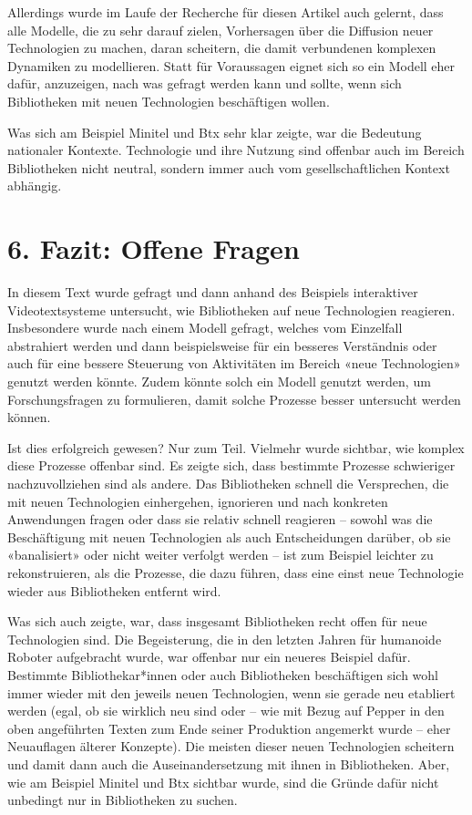 \documentclass[a4paper,
fontsize=11pt,
oneside,
numbers=noperiodatend,
parskip=half-,
bibliography=totoc,
final
]{scrartcl}
\begin{document}
Allerdings wurde im Laufe der Recherche für diesen Artikel auch gelernt,
dass alle Modelle, die zu sehr darauf zielen, Vorhersagen über die
Diffusion neuer Technologien zu machen, daran scheitern, die damit
verbundenen komplexen Dynamiken zu modellieren. Statt für Voraussagen
eignet sich so ein Modell eher dafür, anzuzeigen, nach was gefragt
werden kann und sollte, wenn sich Bibliotheken mit neuen Technologien
beschäftigen wollen.

Was sich am Beispiel Minitel und Btx sehr klar zeigte, war die Bedeutung
nationaler Kontexte. Technologie und ihre Nutzung sind offenbar auch im
Bereich Bibliotheken nicht neutral, sondern immer auch vom
gesellschaftlichen Kontext abhängig.

\hypertarget{fazit-offene-fragen}{%
\section{6. Fazit: Offene Fragen}\label{fazit-offene-fragen}}

In diesem Text wurde gefragt und dann anhand des Beispiels interaktiver
Videotextsysteme untersucht, wie Bibliotheken auf neue Technologien
reagieren. Insbesondere wurde nach einem Modell gefragt, welches vom
Einzelfall abstrahiert werden und dann beispielsweise für ein besseres
Verständnis oder auch für eine bessere Steuerung von Aktivitäten im
Bereich «neue Technologien» genutzt werden könnte. Zudem könnte solch
ein Modell genutzt werden, um Forschungsfragen zu formulieren, damit
solche Prozesse besser untersucht werden können.

Ist dies erfolgreich gewesen? Nur zum Teil. Vielmehr wurde sichtbar, wie
komplex diese Prozesse offenbar sind. Es zeigte sich, dass bestimmte
Prozesse schwieriger nachzuvollziehen sind als andere. Das Bibliotheken
schnell die Versprechen, die mit neuen Technologien einhergehen,
ignorieren und nach konkreten Anwendungen fragen oder dass sie relativ
schnell reagieren -- sowohl was die Beschäftigung mit neuen Technologien
als auch Entscheidungen darüber, ob sie «banalisiert» oder nicht weiter
verfolgt werden -- ist zum Beispiel leichter zu rekonstruieren, als die
Prozesse, die dazu führen, dass eine einst neue Technologie wieder aus
Bibliotheken entfernt wird.

Was sich auch zeigte, war, dass insgesamt Bibliotheken recht offen für
neue Technologien sind. Die Begeisterung, die in den letzten Jahren für
humanoide Roboter aufgebracht wurde, war offenbar nur ein neueres
Beispiel dafür. Bestimmte Bibliothekar*innen oder auch Bibliotheken
beschäftigen sich wohl immer wieder mit den jeweils neuen Technologien,
wenn sie gerade neu etabliert werden (egal, ob sie wirklich neu sind
oder -- wie mit Bezug auf Pepper in den oben angeführten Texten zum Ende
seiner Produktion angemerkt wurde -- eher Neuauflagen älterer Konzepte).
Die meisten dieser neuen Technologien scheitern und damit dann auch die
Auseinandersetzung mit ihnen in Bibliotheken. Aber, wie am Beispiel
Minitel und Btx sichtbar wurde, sind die Gründe dafür nicht unbedingt
nur in Bibliotheken zu suchen.
\end{document}
